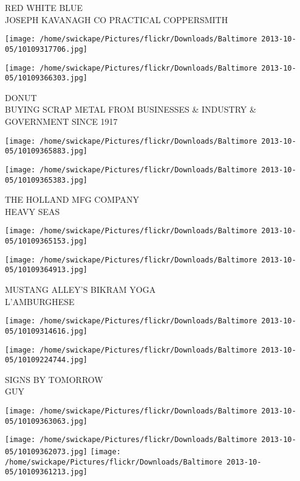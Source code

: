 \documentclass[10pt,letterpaper]{article}
\begin{document}
RED WHITE BLUE\\
JOSEPH KAVANAGH CO PRACTICAL COPPERSMITH\\
\pagebreak

\texttt{[image: /home/swickape/Pictures/flickr/Downloads/Baltimore 2013-10-05/10109317706.jpg]}

\vspace{0.25in}
\texttt{[image: /home/swickape/Pictures/flickr/Downloads/Baltimore 2013-10-05/10109366303.jpg]}

DONUT\\
BUYING SCRAP METAL FROM BUSINESSES \& INDUSTRY \& GOVERNMENT SINCE 1917\\
\pagebreak

\texttt{[image: /home/swickape/Pictures/flickr/Downloads/Baltimore 2013-10-05/10109365883.jpg]}

\vspace{0.25in}
\texttt{[image: /home/swickape/Pictures/flickr/Downloads/Baltimore 2013-10-05/10109365383.jpg]}

THE HOLLAND MFG COMPANY\\
HEAVY SEAS\\
\pagebreak

\texttt{[image: /home/swickape/Pictures/flickr/Downloads/Baltimore 2013-10-05/10109365153.jpg]}

\vspace{0.25in}
\texttt{[image: /home/swickape/Pictures/flickr/Downloads/Baltimore 2013-10-05/10109364913.jpg]}

MUSTANG ALLEY'S BIKRAM YOGA\\
L'AMBURGHESE\\
\pagebreak

\texttt{[image: /home/swickape/Pictures/flickr/Downloads/Baltimore 2013-10-05/10109314616.jpg]}

\vspace{0.25in}
\texttt{[image: /home/swickape/Pictures/flickr/Downloads/Baltimore 2013-10-05/10109224744.jpg]}

SIGNS BY TOMORROW\\
GUY\\
\pagebreak

\texttt{[image: /home/swickape/Pictures/flickr/Downloads/Baltimore 2013-10-05/10109363063.jpg]}

\vspace{0.25in}
\texttt{[image: /home/swickape/Pictures/flickr/Downloads/Baltimore 2013-10-05/10109362073.jpg]}
\texttt{[image: /home/swickape/Pictures/flickr/Downloads/Baltimore 2013-10-05/10109361213.jpg]}
\end{document}
